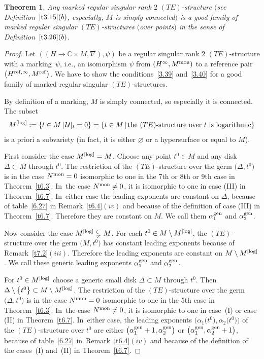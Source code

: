 \documentclass[pdftex]{sigma}%
\numberwithin{equation}{section}
\numberwithin{figure}{section}
\newcommand{\C}{{\mathbb C}}
\newcommand{\UU}{{\mathcal U}}
\newcommand{\nnn}{\nabla}
\newtheorem{Theorem}{Theorem}[section]
\begin{document}
\begin{Theorem}\label{t7.3}
Any marked regular singular rank $2$ $(TE)$-structure
$($see Definition~$\ref{t3.15}(b)$, espe\-cially,
$M$ is simply connected$)$
is a {\it good} family of marked regular singular
$(TE)$-structures $($over points$)$ in the sense of Definition~$\ref{t3.26}(b)$.
\end{Theorem}

\begin{proof} Let $((H\to\C\times M,\nnn),\psi)$
be a regular singular rank $2$
$(TE)$-structure with a marking~$\psi$,
i.e., an isomorphism $\psi$ from $(H^\infty,M^{\rm mon})$
to a reference pair $\big(H^{{\rm ref},\infty},M^{\rm ref}\big)$.
We have to show the conditions~\eqref{3.39} and~\eqref{3.40}
for a good family of marked regular singular $(TE)$-structures.

By definition of a marking, $M$ is simply connected,
so especially it is connected. The subset
\begin{gather*}%
M^{\rm [log]}:=\{t\in M\,|\, \UU|_t=0\}
=\{t\in M\,|\, \text{the }(TE)\text{-structure over }
t\text{ is logarithmic}\}
\end{gather*}
is a priori a subvariety (in fact, it is either $\varnothing$
or a hypersurface or equal to $M$).

First consider the case $M^{\rm [log]}=M$.
Choose any point $t^0\in M$ and any disk $\Delta\subset M$
through $t^0$. The restriction of the $(TE)$-structure
over the germ $\big(\Delta,t^0\big)$ is in the case $N^{\rm mon}=0$
isomorphic to one in the 7th or 8th or 9th case in Theorem~\ref{t6.3}. In~the case $N^{\rm mon}\neq 0$, it is
isomorphic to one in case (III) in Theorem~\ref{t6.7}. In~either case the leading exponents are constant on $\Delta$,
because of table~\eqref{6.27}
in Remark~\ref{t6.4}$(iv)$ and because of the definition
of case (III) in Theorem~\ref{t6.7}.
Therefore they are constant on $M$.
We call them $\alpha_1^{\rm gen}$ and $\alpha_2^{\rm gen}$.

Now consider the case $M^{\rm [log]}\subsetneqq M$.
For each $t^0\in M\setminus M^{\rm [log]}$, the $(TE)$-structure
over the germ $\big(M,t^0\big)$ has constant leading
exponents because of Remark~\ref{t7.2}$(iii)$.
Therefore the leading exponents are constant on
$M\setminus M^{\rm [log]}$. We call these generic leading exponents
$\alpha_1^{\rm gen}$ and $\alpha_2^{\rm gen}$.

For $t^0\in M^{\rm [log]}$ choose a generic small disk
$\Delta\subset M$ through $t^0$. Then
$\Delta\setminus \big\{t^0\big\}\subset M\setminus M^{\rm [log]}$. The restriction of the
$(TE)$-structure over the germ $\big(\Delta,t^0\big)$ is
in the case $N^{\rm mon}=0$ isomorphic to one in the 5th case
in Theorem~\ref{t6.3}. In~the case $N^{\rm mon}\neq 0$,
it is isomorphic to one in case~(I) or case (II)
in Theorem~\ref{t6.7}. In~either case, the leading exponents
$\big(\alpha_1\big(t^0\big),\alpha_2\big(t^0\big)\big)$ of the $(TE)$-structure
over $t^0$ are either $\big(\alpha_1^{\rm gen}+1,\alpha_2^{\rm gen}\big)$
or $\big(\alpha_1^{\rm gen},\alpha_2^{\rm gen}+1\big)$,
because of table~\eqref{6.27} in~Remark~\ref{t6.4}$(iv)$ and
because of the definition of the cases~(I) and~(II)
in Theorem~\ref{t6.7}.


\end{proof}
\end{document}
